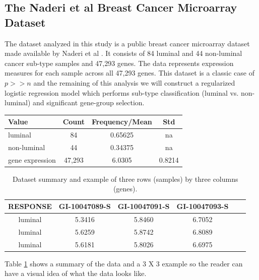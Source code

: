 \documentclass[12pt,a4paper]{article}
\begin{document}
\subsection{The Naderi et al Breast Cancer Microarray Dataset}
The dataset analyzed in this study is a public breast cancer microarray dataset made available by Naderi et al \cite{naderi2007gene}. It consists of 84 luminal and 44 non-luminal cancer sub-type samples and 47,293 genes. The data represents expression measures for each sample across all 47,293 genes. This dataset is a classic case of $p>>n$ and the remaining of this analysis we will construct a regularized logistic regression model which performs sub-type classification (luminal vs. non-luminal) and significant gene-group selection.
\begin{table}
\begin{center}
\begin{tabular}{|l|c|c|c|}
\hline Value & Count & Frequency/Mean & Std\\
\hline luminal & 84 & 0.65625 & na\\
\hline non-luminal & 44 & 0.34375 & na\\
\hline gene expression & 47,293 & 6.0305 & 0.8214\\
\hline
\end{tabular}
\end{center}
\end{table}

\begin{table}
\begin{center}
\begin{tabular}{|c|c|c|c|c|c|}
\hline RESPONSE & GI-10047089-S & GI-10047091-S & GI-10047093-S\\
\hline luminal & 5.3416 & 5.8460 & 6.7052\\
\hline luminal & 5.6259 & 5.8742 & 6.8089\\
\hline luminal & 5.6181 & 5.8026 & 6.6975\\
\hline
\end{tabular}
\caption{Dataset summary and example of three rows (samples) by three columns (genes).}
\label{table:1}
\end{center}
\end{table}
\par Table \ref{table:1} shows a summary of the data and a 3 X 3 example so the reader can have a visual idea of what the data looks like.
\end{document}
